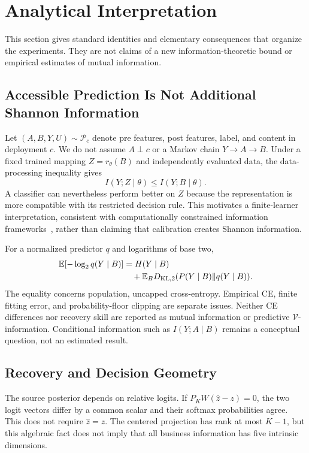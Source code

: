 \section{Analytical Interpretation}
This section gives standard identities and elementary consequences that organize the experiments. They are not claims of a new information-theoretic bound or empirical estimates of mutual information.

\subsection{Accessible Prediction Is Not Additional Shannon Information}
Let $(A,B,Y,U)\sim\mathcal P_c$ denote pre features, post features, label, and content in deployment $c$. We do not assume $A\perp c$ or a Markov chain $Y\to A\to B$. Under a fixed trained mapping $Z=r_\theta(B)$ and independently evaluated data, the data-processing inequality gives
\begin{equation}I(Y;Z\mid\theta)\le I(Y;B\mid\theta).
\end{equation}
A classifier can nevertheless perform better on $Z$ because the representation is more compatible with its restricted decision rule. This motivates a finite-learner interpretation, consistent with computationally constrained information frameworks~\cite{vinfo}, rather than claiming that calibration creates Shannon information.

For a normalized predictor $q$ and logarithms of base two,
\begin{align}
 \mathbb{E}[-\log_2 q(Y\mid B)]&=H(Y\mid B)\nonumber\\
 &\quad+\mathbb{E}_B D_{\mathrm{KL},2}(P(Y\mid B)\|q(Y\mid B)).
\end{align}
The equality concerns population, uncapped cross-entropy. Empirical CE, finite fitting error, and probability-floor clipping are separate issues. Neither CE differences nor recovery skill are reported as mutual information or predictive $\mathcal V$-information. Conditional information such as $I(Y;A\mid B)$ remains a conceptual question, not an estimated result.

\subsection{Recovery and Decision Geometry}
The source posterior depends on relative logits. If $P_KW(\widehat z-z)=0$, the two logit vectors differ by a common scalar and their softmax probabilities agree. This does not require $\widehat z=z$. The centered projection has rank at most $K-1$, but this algebraic fact does not imply that all business information has five intrinsic dimensions.

